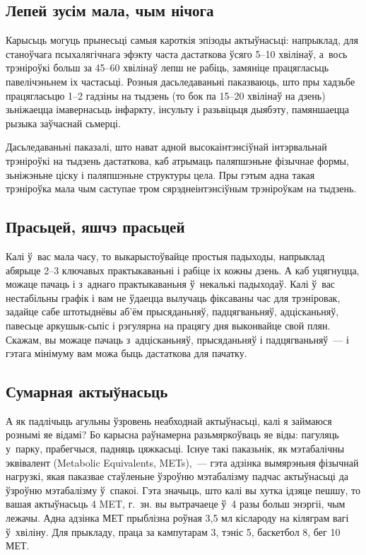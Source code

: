 \subsection*{Лепей зусім мала, чым нічога}

Карысьць могуць прынесьці самыя кароткія эпізоды актыўнасьці: напрыклад, для станоўчага псыхалягічнага эфэкту часта дастаткова ўсяго 5--10 хвілінаў, а~вось трэніроўкі больш за 45--60 хвілінаў лепш не рабіць, замяніце працягласьць павелічэньнем іх частасьці. Розныя дасьледаваньні паказваюць, што пры хадзьбе працягласьцю 1--2 гадзіны на тыдзень (то бок па 15--20 хвілінаў на дзень) зьніжаецца імавернасьць інфаркту, інсульту і разьвіцьця дыябэту, памяншаецца рызыка заўчаснай сьмерці.

Дасьледаваньні паказалі, што нават адной высокаінтэнсіўнай інтэрвальнай трэніроўкі на тыдзень дастаткова, каб атрымаць паляпшэньне фізычнае формы, зьніжэньне ціску і паляпшэньне структуры цела. Пры гэтым адна такая трэніроўка мала чым саступае тром сярэднеінтэнсіўным трэніроўкам на тыдзень.

\subsection*{Прасьцей, яшчэ прасьцей} Калі ў~вас мала часу, то выкарыстоўвайце простыя падыходы, напрыклад абярыце 2--3 ключавых практыкаваньні і рабіце іх кожны дзень. А каб уцягнуцца, можаце пачаць і з~аднаго практыкаваньня ў~некалькі падыходаў. Калі ў~вас нестабільны графік і вам не ўдаецца вылучаць фіксаваны час для трэніровак, задайце сабе штотыднёвы аб'ём прысяданьняў, падцягваньняў, адцісканьняў, павесьце аркушык-сьпіс і рэгулярна на працягу дня выконвайце свой плян. Скажам, вы можаце пачаць з~адцісканьняў, прысяданьняў і падцягваньняў~--- і гэтага мінімуму вам можа быць дастаткова для пачатку.

\subsection*{Сумарная актыўнасьць}

А як падлічыць агульны ўзровень неабходнай актыўнасьці, калі я займаюся рознымі яе відамі? Бо карысна раўнамерна разьмяркоўваць яе віды: пагуляць у~парку, прабегчыся, падняць цяжкасьці. Існуе такі паказьнік, як мэтабалічны эквівалент (Metabolic Equivalents, METs),~--- гэта адзінка вымярэньня фізычнай нагрузкі, якая паказвае стаўленьне ўзроўню мэтабалізму падчас актыўнасьці да ўзроўню мэтабалізму ў~спакоі. Гэта значыць, што калі вы хутка ідзяце пешшу, то вашая актыўнасьць 4 MET, г.~зн. вы вытрачаеце ў~4 разы больш энэргіі, чым лежачы. Адна адзінка МЕТ прыблізна роўная 3,5 мл кіслароду на кіляграм вагі ў~хвіліну. Для прыкладу, праца за кампутарам 3, тэніс 5, баскетбол 8, бег 10 МЕТ.

